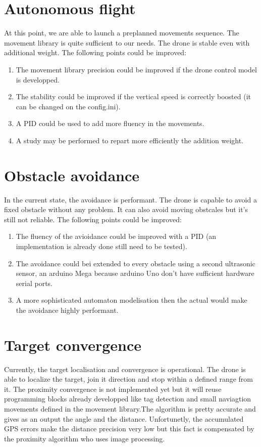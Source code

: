 \section{Autonomous flight}

At this point, we are able to launch a preplanned movements sequence. The movement library is quite sufficient to our needs.
The drone is stable even with additional weight. 
The following points  could be improved:

\begin{enumerate}
\item The movement library precision could be improved if the drone control model is developped.
\item The stability could be improved if the vertical speed is correctly boosted (it can be changed on the config.ini).
\item A PID could be used to add more fluency in the movements.
\item A study may be performed to repart more efficiently the addition weight.
\end{enumerate}

\section{Obstacle avoidance}
In the current state, the avoidance is performant. The drone is capable to avoid a fixed obstacle without any problem.
It can also avoid moving obstcales but it's still not reliable.
The following points could be improved:
\begin{enumerate}
\item The fluency of the avioidance could be improved with a PID (an implementation is already done still need to be tested).
\item The avoidance could bei extended to every obstacle using a second ultrasonic sensor, an arduino Mega because arduino Uno don't have sufficient hardware serial ports.
\item A more sophisticated automaton modelisation then the actual would make the avoidance highly performant.
\end{enumerate}

\section{Target convergence}

Currently, the target localisation and convergence is operational. The drone is able to localize the target, join it direction and stop within a defined range from it. The proximity convergence is not implemented yet but it will reuse programming blocks already developped like tag detection and small naviagtion movements defined in the movement library.The algorithm is pretty accurate and gives as an output the angle and the distance. Unfortunetly, the accumulated GPS errors make the distance precision very low but this fact is compensated by the proximity algorithm who uses image processing.

